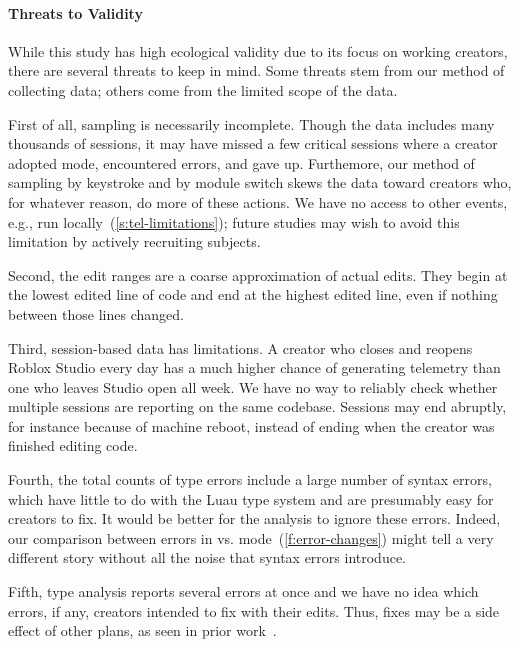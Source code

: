 \documentclass[english,submission,cleveref]{programming}
\begin{document}
\paragraph{Threats to Validity}
\label{s:threats}

While this study has high ecological validity due to its focus on
working creators, there are several threats to keep in mind.
Some threats stem from our method of collecting data; others
come from the limited scope of the data.

First of all, sampling is necessarily incomplete.
Though the data includes many thousands of sessions, it
may have missed a few critical sessions where a creator
adopted \mstrict{} mode, encountered  errors,
and gave up.
Furthemore, our method of sampling by keystroke and by module switch
skews the data toward creators who, for whatever reason, do more
of these actions.
We have no access to other events, e.g., run locally~(\cref{s:tel-limitations});
future studies may wish to avoid this limitation by actively
recruiting subjects.

Second, the edit ranges are a coarse approximation of actual edits.
They begin at the lowest edited line of code and end at the highest
edited line, even if nothing between those lines changed.

Third, session-based data has limitations.
A creator who closes and reopens Roblox Studio every day has
a much higher chance of generating telemetry than one who
leaves Studio open all week.
We have no way to reliably check whether multiple sessions are
reporting on the same codebase.
Sessions may end abruptly, for instance because of machine reboot,
instead of ending when the creator was finished editing code.

Fourth, the total counts of type errors include a large number of syntax errors,
which have little to do with the Luau type system and are presumably easy for
creators to fix.
It would be better for the analysis to ignore these errors.
Indeed, our comparison between \FS{} errors in \mnocheck{} vs.
\mstrict{} mode~(\cref{f:error-changes}) might tell a very different story
without all the noise that syntax errors introduce.

Fifth, type analysis reports several errors at once and we have no idea which
errors, if any, creators intended to fix with their edits.
Thus, fixes may be a side effect of other plans, as seen in prior work~\cite{mfk-sigcse-2011}.
\end{document}

